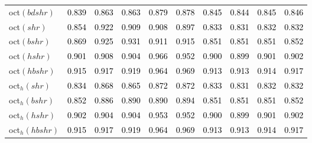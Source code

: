 \begin{tabular}[t]{>{\centering\arraybackslash}m{2.5cm}ccccccccc}
oct$(bdshr)$ & \textcolor{black}{0.839} & \textcolor{black}{0.863} & \textcolor{black}{0.863} & \textcolor{black}{0.879} & \textcolor{black}{0.878} & \textcolor{black}{0.845} & \textcolor{black}{0.844} & \textcolor{black}{0.845} & \textcolor{black}{0.846}\\
oct$(shr)$ & \textcolor{black}{0.854} & \textcolor{black}{0.922} & \textcolor{black}{0.909} & \textcolor{black}{0.908} & \textcolor{black}{0.897} & \textcolor{black}{0.833} & \textcolor{black}{0.831} & \textcolor{black}{0.832} & \textcolor{black}{0.832}\\
oct$(bshr)$ & \textcolor{black}{0.869} & \textcolor{black}{0.925} & \textcolor{black}{0.931} & \textcolor{black}{0.911} & \textcolor{black}{0.915} & \textcolor{black}{0.851} & \textcolor{black}{0.851} & \textcolor{black}{0.851} & \textcolor{black}{0.852}\\
oct$(hshr)$ & \textcolor{black}{0.901} & \textcolor{black}{0.908} & \textcolor{black}{0.904} & \textcolor{black}{0.966} & \textcolor{black}{0.952} & \textcolor{black}{0.900} & \textcolor{black}{0.899} & \textcolor{black}{0.901} & \textcolor{black}{0.902}\\
oct$(hbshr)$ & \textcolor{black}{0.915} & \textcolor{black}{0.917} & \textcolor{black}{0.919} & \textcolor{black}{0.964} & \textcolor{black}{0.969} & \textcolor{black}{0.913} & \textcolor{black}{0.913} & \textcolor{black}{0.914} & \textcolor{black}{0.917}\\
oct$_h(shr)$ & \textcolor{black}{0.834} & \textcolor{black}{0.868} & \textcolor{black}{0.865} & \textcolor{black}{0.872} & \textcolor{black}{0.872} & \textcolor{black}{0.833} & \textcolor{black}{0.831} & \textcolor{black}{0.832} & \textcolor{black}{0.832}\\
oct$_h(bshr)$ & \textcolor{black}{0.852} & \textcolor{black}{0.886} & \textcolor{black}{0.890} & \textcolor{black}{0.890} & \textcolor{black}{0.894} & \textcolor{black}{0.851} & \textcolor{black}{0.851} & \textcolor{black}{0.851} & \textcolor{black}{0.852}\\
oct$_h(hshr)$ & \textcolor{black}{0.902} & \textcolor{black}{0.904} & \textcolor{black}{0.904} & \textcolor{black}{0.953} & \textcolor{black}{0.952} & \textcolor{black}{0.900} & \textcolor{black}{0.899} & \textcolor{black}{0.901} & \textcolor{black}{0.902}\\
oct$_h(hbshr)$ & \textcolor{black}{0.915} & \textcolor{black}{0.917} & \textcolor{black}{0.919} & \textcolor{black}{0.964} & \textcolor{black}{0.969} & \textcolor{black}{0.913} & \textcolor{black}{0.913} & \textcolor{black}{0.914} & \textcolor{black}{0.917}\\
\bottomrule
\end{tabular}
